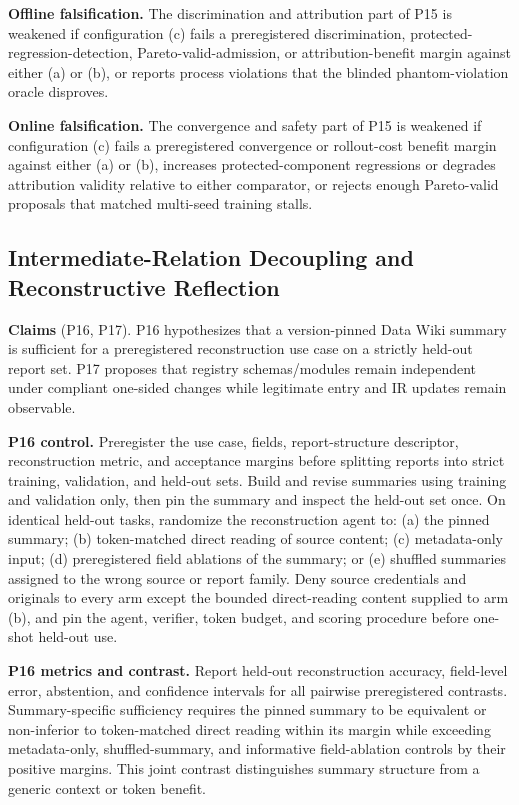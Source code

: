 \textbf{Offline falsification.} The discrimination and attribution part of P15 is weakened if configuration (c) fails a preregistered discrimination, protected-regression-detection, Pareto-valid-admission, or attribution-benefit margin against either (a) or (b), or reports process violations that the blinded phantom-violation oracle disproves.

\textbf{Online falsification.} The convergence and safety part of P15 is weakened if configuration (c) fails a preregistered convergence or rollout-cost benefit margin against either (a) or (b), increases protected-component regressions or degrades attribution validity relative to either comparator, or rejects enough Pareto-valid proposals that matched multi-seed training stalls.

\subsection{Intermediate-Relation Decoupling and Reconstructive Reflection}
\label{sec:eval-ir}

\textbf{Claims} (P16, P17). P16 hypothesizes that a version-pinned Data Wiki summary is sufficient for a preregistered reconstruction use case on a strictly held-out report set. P17 proposes that registry schemas/modules remain independent under compliant one-sided changes while legitimate entry and IR updates remain observable.

\textbf{P16 control.} Preregister the use case, fields, report-structure descriptor, reconstruction metric, and acceptance margins before splitting reports into strict training, validation, and held-out sets. Build and revise summaries using training and validation only, then pin the summary and inspect the held-out set once. On identical held-out tasks, randomize the reconstruction agent to: (a) the pinned summary; (b) token-matched direct reading of source content; (c) metadata-only input; (d) preregistered field ablations of the summary; or (e) shuffled summaries assigned to the wrong source or report family. Deny source credentials and originals to every arm except the bounded direct-reading content supplied to arm (b), and pin the agent, verifier, token budget, and scoring procedure before one-shot held-out use.

\textbf{P16 metrics and contrast.} Report held-out reconstruction accuracy, field-level error, abstention, and confidence intervals for all pairwise preregistered contrasts. Summary-specific sufficiency requires the pinned summary to be equivalent or non-inferior to token-matched direct reading within its margin while exceeding metadata-only, shuffled-summary, and informative field-ablation controls by their positive margins. This joint contrast distinguishes summary structure from a generic context or token benefit.

